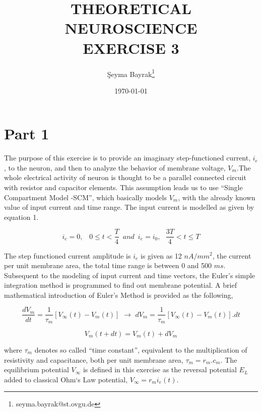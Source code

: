 \documentclass{article}
\begin{document}
\title{THEORETICAL NEUROSCIENCE \\ EXERCISE 3}
\date{\today}
\author[1]{\c{S}eyma Bayrak\thanks{seyma.bayrak@st.ovgu.de}}
\maketitle


\section*{Part 1}
The purpose of this exercise is to provide an imaginary step-functioned current, $i_{e}$, to the neuron, and then to analyze the behavior of membrane voltage, $V_{m}$.The whole electrical activity of neuron is thought to be a parallel connected circuit with resistor and capacitor elements. This assumption leads us to use ``Single Compartment Model -SCM'', which basically models $V_{m}$, with the already known value of input current and time range. The input current is modelled as given by equation 1.

\begin{equation}
 i_{e}=0,\,\,\,\,\,  0\le t <\dfrac{T}{4} \,\,\,and\,\,\, i_{e}=i_{0},\,\,\,\, \frac{3T}{4}<t\le T
\end{equation}

The step functioned current amplitude is $i_{e}$ is given as 12 $nA/mm^{2}$, the current per unit membrane area, the total time range is between 0 and 500 $ms$. Subsequent to the modeling of input current and time vectors, the Euler’s simple integration method is programmed to find out membrane potential. A brief mathematical introduction of Euler’s Method is provided as the following,

\begin{equation}
 \dfrac{dV_{m}}{dt}=\dfrac{1}{\tau_{m}}[V_{\infty}(t)-V_{m}(t)] \,\, \longrightarrow \,\, dV_{m}=\dfrac{1}{\tau_{m}}[V_{\infty}(t)-V_{m}(t)].dt
\end{equation}

\begin{equation}
V_{m}(t+dt)=V_{m}(t)+dV_{m}
\end{equation}

where $\tau_{m}$ denotes so called ``time constant'', equivalent to the multiplication of resistivity and capacitance, both per unit membrane area, $\tau_{m}=r_{m}.c_{m}$. The equilibrium potential $V_{\infty}$ is defined in this exercise as the reversal potential $E_{L}$ added to classical Ohm`s Law potential, $V_{\infty}=r_{m}i_{e}(t)$. 
\end{document}
